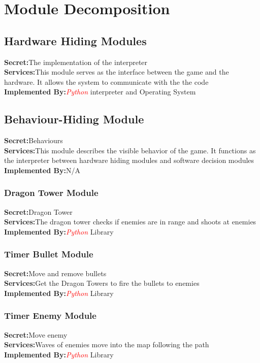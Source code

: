 \documentclass{article}
\begin{document}
\section{Module Decomposition}
\subsection{Hardware Hiding Modules}
\textbf{Secret:}The implementation of the interpreter\\
\textbf{Services:}This module serves as the interface between the game and the hardware. It allows the system to communicate with the the code\\
\textbf{Implemented By:}\textcolor{red}{\textit{Python}} interpreter and Operating System\\

\subsection{Behaviour-Hiding Module}
\textbf{Secret:}Behaviours\\
\textbf{Services:}This module describes the visible behavior of the game. It functions as the interpreter between hardware hiding modules and software decision modules\\
\textbf{Implemented By:}N/A\\

\subsubsection{Dragon Tower Module}
\textbf{Secret:}Dragon Tower\\
\textbf{Services:}The dragon tower checks if enemies are in range and shoots at enemies\\
\textbf{Implemented By:}\textcolor{red}{\textit{Python}} Library\\

\subsubsection{Timer Bullet Module}
\textbf{Secret:}Move and remove bullets\\
\textbf{Services:}Get the Dragon Towers to fire the bullets to enemies\\
\textbf{Implemented By:}\textcolor{red}{\textit{Python}} Library\\

\subsubsection{Timer Enemy Module}
\textbf{Secret:}Move enemy\\
\textbf{Services:}Waves of enemies move into the map following the path\\
\textbf{Implemented By:}\textcolor{red}{\textit{Python}} Library\\
\end{document}

